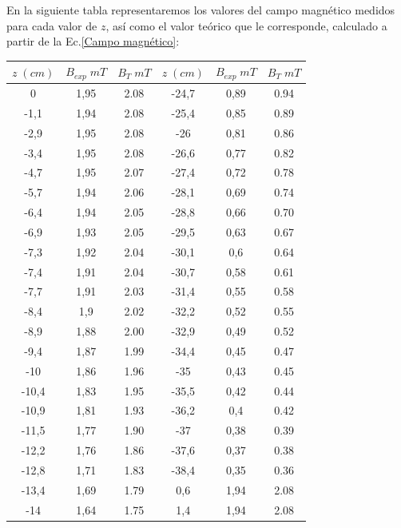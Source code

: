 \documentclass[a4paper,12pt,titlepage]{article}
\begin{document}
En la siguiente tabla representaremos los valores del campo magnético medidos para cada valor de $z$, así como el valor teórico que le corresponde, calculado a partir de la Ec.\ref{Campo magnético}:

\newpage

\begin{longtable}[t]{|c|c|c|c|c|c|}
    \hline
    $z \; (cm)$ & $B_{exp} \; mT$ & $B_T \; mT$ & $z \; (cm)$ & $B_{exp} \; mT$ & $B_T \; mT$ \\ \hline
    0      & 1,95 & 2.08 & -24,7 & 0,89 & 0.94 \\ \hline
    -1,1   & 1,94 & 2.08 & -25,4 & 0,85 & 0.89 \\ \hline
    -2,9   & 1,95 & 2.08 & -26   & 0,81 & 0.86 \\ \hline
    -3,4   & 1,95 & 2.08 & -26,6 & 0,77 & 0.82 \\ \hline
    -4,7   & 1,95 & 2.07 & -27,4 & 0,72 & 0.78 \\ \hline
    -5,7   & 1,94 & 2.06 & -28,1 & 0,69 & 0.74 \\ \hline
    -6,4   & 1,94 & 2.05 & -28,8 & 0,66 & 0.70 \\ \hline
    -6,9   & 1,93 & 2.05 & -29,5 & 0,63 & 0.67 \\ \hline
    -7,3   & 1,92 & 2.04 & -30,1 & 0,6  & 0.64 \\ \hline
    -7,4   & 1,91 & 2.04 & -30,7 & 0,58 & 0.61 \\ \hline
    -7,7   & 1,91 & 2.03 & -31,4 & 0,55 & 0.58 \\ \hline
    -8,4   & 1,9  & 2.02 & -32,2 & 0,52 & 0.55 \\ \hline
    -8,9   & 1,88 & 2.00 & -32,9 & 0,49 & 0.52 \\ \hline
    -9,4   & 1,87 & 1.99 & -34,4 & 0,45 & 0.47 \\ \hline
    -10    & 1,86 & 1.96 & -35   & 0,43 & 0.45 \\ \hline
    -10,4  & 1,83 & 1.95 & -35,5 & 0,42 & 0.44 \\ \hline
    -10,9  & 1,81 & 1.93 & -36,2 & 0,4  & 0.42 \\ \hline
    -11,5  & 1,77 & 1.90 & -37   & 0,38 & 0.39 \\ \hline
    -12,2  & 1,76 & 1.86 & -37,6 & 0,37 & 0.38 \\ \hline
    -12,8  & 1,71 & 1.83 & -38,4 & 0,35 & 0.36 \\ \hline
    -13,4  & 1,69 & 1.79 & 0,6   & 1,94 & 2.08 \\ \hline
    -14    & 1,64 & 1.75 & 1,4   & 1,94 & 2.08 \\ \hline

\end{longtable}
\end{document}

